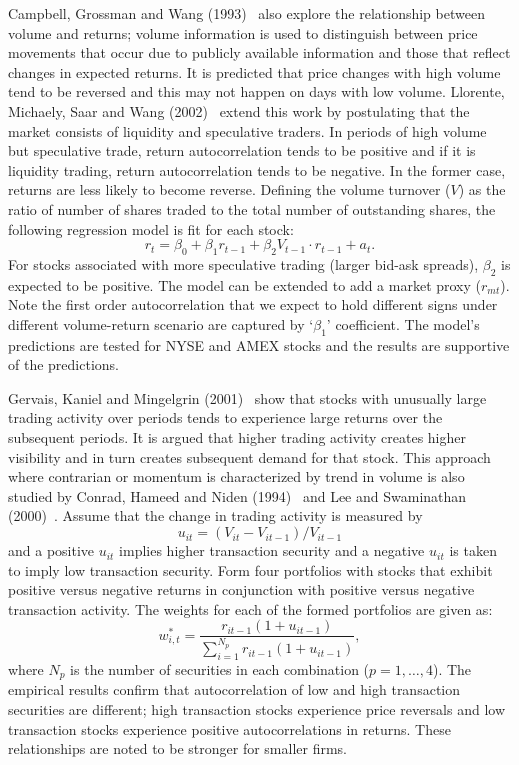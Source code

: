 Campbell, Grossman and Wang (1993)~\cite{campbellgross} also explore the relationship between volume and returns; volume information is used to distinguish between price movements that occur due to publicly available information and those that reflect changes in expected returns. It is predicted that price changes with high volume tend to be reversed and this may not happen on days with low volume. Llorente, Michaely, Saar and Wang (2002)~\cite{llmsw} extend this work by postulating that the market consists of liquidity and speculative traders. In periods of high volume but speculative trade, return autocorrelation tends to be positive and if it is liquidity trading, return autocorrelation tends to be negative. In the former case, returns are less likely to become reverse. Defining the volume turnover ($V$) as the ratio of number of shares traded to the total number of outstanding shares, the following regression model is fit for each stock:
	\begin{equation} \label{eqn:regxt}
	r_t= \beta_0 + \beta_1 r_{t-1} + \beta_2 V_{t-1} \cdot r_{t-1} + a_t.
	\end{equation}
For stocks associated with more speculative trading (larger bid-ask spreads), $\beta_2$ is expected to be positive. The model can be extended to add a market proxy ($r_{mt}$). Note the first order autocorrelation that we expect to hold different signs under different volume-return scenario are captured by `$\beta_1$' coefficient. The model's predictions are tested for NYSE and AMEX stocks and the results are supportive of the predictions. 


Gervais, Kaniel and Mingelgrin (2001)~\cite{germing} show that stocks with unusually large trading activity over periods tends to experience large returns over the subsequent periods. It is argued that higher trading activity creates higher visibility and in turn creates subsequent demand for that stock. This approach where contrarian or momentum is characterized by trend in volume is also studied by Conrad, Hameed and Niden (1994)~\cite{conniden} and Lee and Swaminathan (2000)~\cite{lee2000}. Assume that the change in trading activity is measured by
	\begin{equation} \label{eqn:uit3}
	u_{it}= (V_{it} - V_{it-1}) / V_{it-1}
	\end{equation}   
and a positive $u_{it}$ implies higher transaction security and a negative $u_{it}$ is taken to imply low transaction security. Form four portfolios with stocks that exhibit positive versus negative returns in conjunction with positive versus negative transaction activity. The weights for each of the formed portfolios are given as:
	\begin{equation} \label{eqn:wip3}
	w^*_{i,t} = \dfrac{r_{it-1}(1+u_{it-1})}{\sum_{i=1}^{N_p} r_{it-1}(1+u_{it-1})},
	\end{equation}
where $N_p$ is the number of securities in each combination ($p=1, \ldots, 4$). The empirical results confirm that autocorrelation of low and high transaction securities are different; high transaction stocks experience price reversals and low transaction stocks experience positive autocorrelations in returns. These relationships are noted to be stronger for smaller firms. 


